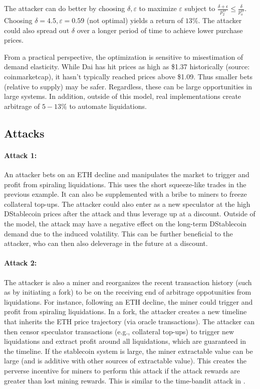 The attacker can do better by choosing $\delta,\varepsilon$ to maximize $\varepsilon$ subject to $\frac{\delta + \epsilon}{p_2^D} \leq \frac{\delta}{p_o^D}$. Choosing $\delta=4.5, \varepsilon=0.59$ (not optimal) yields a return of $13\%$. The attacker could also spread out $\delta$ over a longer period of time to achieve lower purchase prices.

From a practical perspective, the optimization is sensitive to misestimation of demand elasticity. While Dai has hit prices as high as \$1.37 historically (source: coinmarketcap), it hasn't typically reached prices above \$1.09. Thus smaller bets (relative to supply) may be safer. Regardless, these can be large opportunities in large systems. In addition, outside of this model, real implementations create arbitrage of $5-13\%$ to automate liquidations.





\subsection{Attacks}

\paragraph{Attack 1:} An attacker bets on an ETH decline and manipulates the market to trigger and profit from spiraling liquidations. This uses the short squeeze-like trades in the previous example. It can also be supplemented with a bribe to miners to freeze collateral top-ups. The attacker could also enter as a new speculator at the high DStablecoin prices after the attack and thus leverage up at a discount. Outside of the model, the attack may have a negative effect on the long-term DStablecoin demand due to the induced volatility. This can be further beneficial to the attacker, who can then also deleverage in the future at a discount.

\paragraph{Attack 2:} The attacker is also a miner and reorganizes the recent transaction history (such as by initiating a fork) to be on the receiving end of arbitrage oppotunities from liquidations. For instance, following an ETH decline, the miner could trigger and profit from spiraling liquidations. In a fork, the attacker creates a new timeline that inherits the ETH price trajectory (via oracle transactions). The attacker can then censor speculator transactions (e.g., collateral top-ups) to trigger new liquidations and extract profit around all liquidations, which are guaranteed in the timeline. If the stablecoin system is large, the miner extractable value can be large (and is additive with other sources of extractable value). This creates the perverse incentive for miners to perform this attack if the attack rewards are greater than lost mining rewards. This is similar to the time-bandit attack in \cite{daian2019}.

